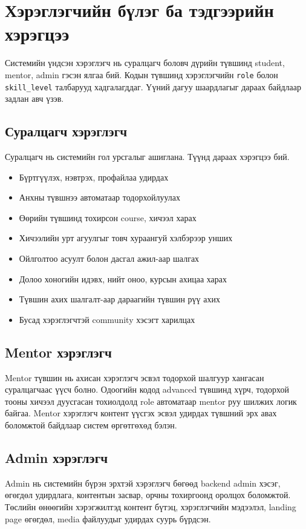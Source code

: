 \section{Хэрэглэгчийн бүлэг ба тэдгээрийн хэрэгцээ}
Системийн үндсэн хэрэглэгч нь суралцагч боловч дүрийн түвшинд student, mentor, admin гэсэн ялгаа бий. Кодын түвшинд хэрэглэгчийн \texttt{role} болон \texttt{skill\_level} талбарууд хадгалагддаг. Үүний дагуу шаардлагыг дараах байдлаар задлан авч үзэв.

\subsection{Суралцагч хэрэглэгч}
Суралцагч нь системийн гол урсгалыг ашиглана. Түүнд дараах хэрэгцээ бий.
\begin{itemize}
\item Бүртгүүлэх, нэвтрэх, профайлаа удирдах
\item Анхны түвшнээ автоматаар тодорхойлуулах
\item Өөрийн түвшинд тохирсон course, хичээл харах
\item Хичээлийн урт агуулгыг товч хураангуй хэлбэрээр унших
\item Ойлголтоо асуулт болон дасгал ажил-аар шалгах
\item Долоо хоногийн идэвх, нийт оноо, курсын ахицаа харах
\item Түвшин ахих шалгалт-аар дараагийн түвшин рүү ахих
\item Бусад хэрэглэгчтэй community хэсэгт харилцах
\end{itemize}

\subsection{Mentor хэрэглэгч}
Mentor түвшин нь ахисан хэрэглэгч эсвэл тодорхой шалгуур хангасан суралцагчаас үүсч болно. Одоогийн кодод advanced түвшинд хүрч, тодорхой тооны хичээл дуусгасан тохиолдолд role автоматаар mentor руу шилжих логик байгаа. Mentor хэрэглэгч контент үүсгэх эсвэл удирдах түвшний эрх авах боломжтой байдлаар систем өргөтгөхөд бэлэн.

\subsection{Admin хэрэглэгч}
Admin нь системийн бүрэн эрхтэй хэрэглэгч бөгөөд backend admin хэсэг, өгөгдөл удирдлага, контентын засвар, орчны тохиргоонд оролцох боломжтой. Төслийн өнөөгийн хэрэгжилтэд контент бүтэц, хэрэглэгчийн мэдээлэл, landing page өгөгдөл, media файлуудыг удирдах суурь бүрдсэн.

